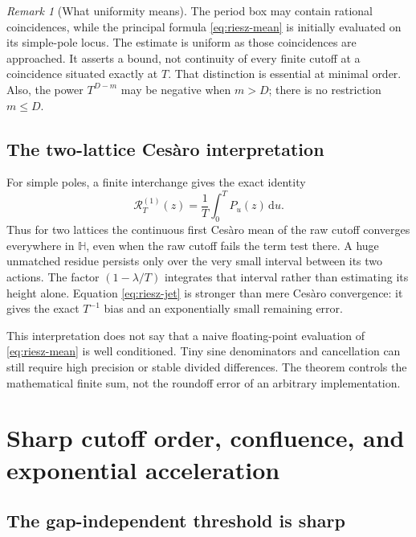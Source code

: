 \documentclass[11pt,a4paper]{article}
\numberwithin{equation}{section}
\theoremstyle{definition}
\theoremstyle{remark}
\newtheorem{remark}[theorem]{Remark}
\newcommand{\dd}{\,\mathrm d}
\newcommand{\Hh}{\mathbb H}
\newcommand{\Riesz}{\mathcal R}
\begin{document}
\begin{remark}[What uniformity means]
The period box may contain rational coincidences, while the principal
formula \eqref{eq:riesz-mean} is initially evaluated on its simple-pole
locus. The estimate is uniform as those coincidences are approached.
It asserts a bound, not continuity of every finite cutoff at a
coincidence situated exactly at $T$. That distinction is essential at
minimal order. Also, the power $T^{D-m}$ may be negative when $m>D$;
there is no restriction $m\le D$.
\end{remark}

\subsection{The two-lattice Ces\`aro interpretation}
For simple poles, a finite interchange gives the exact identity
\begin{equation}
 \Riesz_T^{(1)}(z)=\frac1T\int_0^T P_u(z)\dd u.
 \label{eq:cesaro}
\end{equation}
Thus for two lattices the continuous first Ces\`aro mean of the raw
cutoff converges everywhere in $\Hh$, even when the raw cutoff fails
the term test there. A huge unmatched residue persists only over the
very small interval between its two actions. The factor
$(1-\lambda/T)$ integrates that interval rather than estimating its
height alone. Equation \eqref{eq:riesz-jet} is stronger than mere
Ces\`aro convergence: it gives the exact $T^{-1}$ bias and an
exponentially small remaining error.

This interpretation does not say that a naive floating-point evaluation
of \eqref{eq:riesz-mean} is well conditioned. Tiny sine denominators
and cancellation can still require high precision or stable divided
differences. The theorem controls the mathematical finite sum, not the
roundoff error of an arbitrary implementation.

\section{Sharp cutoff order, confluence, and exponential acceleration}
\label{sec:sharpness}

\subsection{The gap-independent threshold is sharp}
\end{document}
